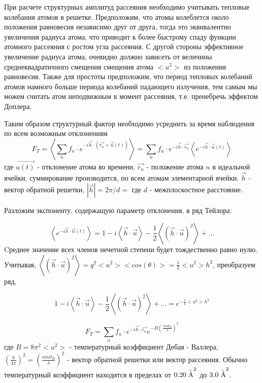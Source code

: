 
При расчете структурных амплитуд рассеяния необходимо учитывать
тепловые колебания атомов в решетке. Предположим, что атомы колеблется около положения
равновесия независимо друг от друга, тогда это эквивалентно увеличения радиуса атома,
что приводит к более быстрому спаду функции атомного рассеяния с ростом угла рассеяния.
С другой стороны эффективное увеличение радиуса атома, очевидно должно зависеть от
величины среднеквадратичного смещения смещения атома  $<u^2>$ из положения равновесия.
Также для простоты предположим, что период тепловых колебаний атомов намного больше периода
колебаний падающего излучения, тем самым мы можем считать атом неподвижным в момент рассеяния,
т.е. пренебречь эффектом Доплера.

Таким образом структурный фактор необходимо усреднить за время наблюдения по всем возможным отклонениям
\begin{equation}
  F_T = \left\langle \sum_{n} f_n \cdot  e^{-i\vec {h} \cdot (\vec{r_n}+ \vec{u}(t))} \right\rangle =  \sum_{n} f_n \cdot  e^{-i\vec {h} \cdot \vec{r_n}}  \left\langle e^{-i \vec{h} \cdot \vec {u}(t)  } \right\rangle
 \end{equation}
\noindent
где $\vec{u(t)}$ - отклонение атома во времени, $\vec{r_n}$ - положение атома $n$
в идеальной ячейки, суммирование производится, по всем атомам элементарной ячейки.
$\vec{h}$ - вектор обратной решетки, $|\vec{h}| = 2 \pi / d = $ где $d$ - межплоскостное расстояние.

Разложим экспоненту, содержащую параметр отклонения, в ряд Тейлора:

\begin{equation}
  \left\langle e^{-i \vec{h} \cdot \vec {u}(t)  } \right\rangle = 1 - i  \left\langle \vec{h} \cdot \vec {u} \right\rangle - \frac{1}{2} \left\langle (\vec{h} \cdot \vec {u})^2 \right\rangle+ \ldots
 \end{equation}
\noindent
 Cреднее значение всех членов нечетной степени будет тождественно равно нулю.
Учитывая,  $ \left\langle (\vec{h} \cdot \vec {u})^2 \right\rangle = q^2 <u^2> <cos(\theta)> = \frac{1}{2}<u^2>h^2$, преобразуем ряд,

\begin{equation}
1 - i  \left\langle \vec{h} \cdot \vec {u} \right\rangle - \frac{1}{2} \left\langle (\vec{h} \cdot \vec {u})^2 \right\rangle+ \ldots = e^{-\frac{1}{2} <u^2> h^2}
 \end{equation}


 \begin{equation}
   F_T =  \sum_{n} f_n \cdot  e^{-i\vec {h} \cdot \vec{r_n}}  e^{-B (\frac{sin\theta_B}{\lambda} )^2 }
  \end{equation}
\noindent
 где $B = 8 \pi^2 <u^2>$ - температурный коэффициент Дебая - Валлера,
 $(\frac{h}{4\pi})^2=(\frac{sin\vartheta_B}{\lambda})^2$ -
 вектор обратной решетки или вектор рассеяния. Обычно температурный коэффициент
 находится в пределах от $0.20 \angstrom ^2$ до $3.0 \angstrom ^2$.

